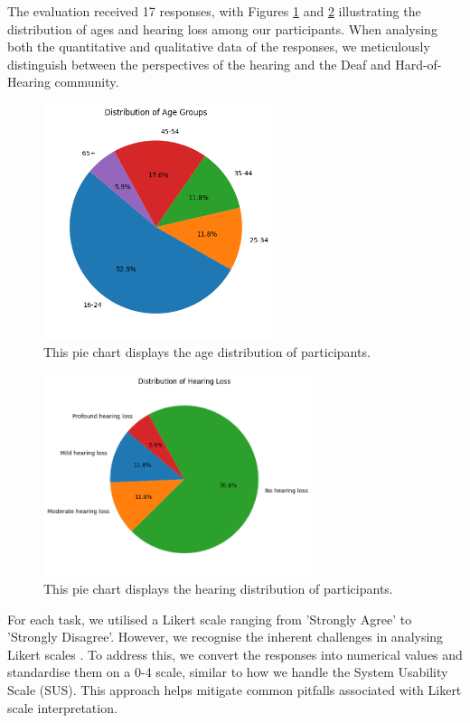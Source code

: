 \documentclass{l4proj}
\begin{document}
The evaluation received 17 responses, with  Figures \ref{fig:ages} and \ref{fig:hearing} illustrating the distribution of ages and hearing loss among our participants. When analysing both the quantitative and qualitative data of the responses, we meticulously distinguish between the perspectives of the hearing and the Deaf and Hard-of-Hearing community.

\begin{figure}
    \centering
    \includegraphics[width=0.6\textwidth]{dissertation/images/ages.png}
    \caption{This pie chart displays the age distribution of participants.}
    \label{fig:ages}
\end{figure}

\begin{figure}
    \centering
    \includegraphics[width=0.7\textwidth]{dissertation/images/hearing.png}
    \caption{This pie chart displays the hearing distribution of participants.}
    \label{fig:hearing}
\end{figure}

For each task, we utilised a Likert scale ranging from 'Strongly Agree' to 'Strongly Disagree'. However, we recognise the inherent challenges in analysing Likert scales \citep{harpe2015analyze, likert}. To address this, we convert the responses into numerical values and standardise them on a 0-4 scale, similar to how we handle the System Usability Scale (SUS). This approach helps mitigate common pitfalls associated with Likert scale interpretation.
\end{document}
